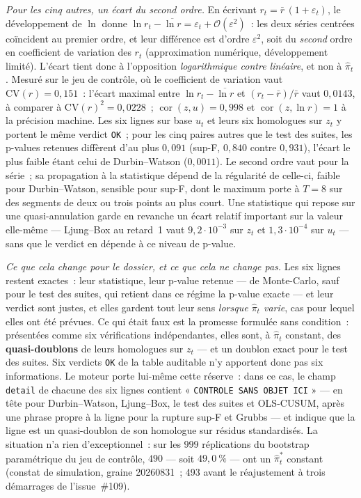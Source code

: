 \documentclass[a4paper,11pt]{article}
\newcommand{\code}[1]{\texttt{\small #1}}
\begin{document}
\emph{Pour les cinq autres, un écart du second ordre.} En écrivant
$r_t = \bar r\,(1 + \varepsilon_t)$, le développement de $\ln$ donne
$\ln r_t - \overline{\ln r} = \varepsilon_t + \mathcal{O}(\varepsilon^2)$~: les
deux séries centrées coïncident au premier ordre, et leur différence est
d'ordre $\varepsilon^2$, soit du \emph{second} ordre en coefficient de
variation des $r_t$ (approximation numérique, développement limité). L'écart
tient donc à l'opposition \emph{logarithmique contre linéaire}, et non à
$\hat\pi_t$. Mesuré sur le jeu de contrôle, où le coefficient de variation vaut
$\mathrm{CV}(r) = 0{,}151$~: l'écart maximal entre $\ln r_t - \overline{\ln r}$
et $(r_t - \bar r)/\bar r$ vaut $0{,}0143$, à comparer à
$\mathrm{CV}(r)^2 = 0{,}0228$~;
$\operatorname{cor}(z, u) = 0{,}998$ et $\operatorname{cor}(z, \ln r) = 1$ à la
précision machine. Les six lignes sur base $u_t$ et leurs six homologues sur
$z_t$ y portent le même verdict \code{OK}~; pour les cinq paires autres que le
test des suites, les p-values retenues diffèrent d'au plus $0{,}091$ (sup-F,
$0{,}840$ contre $0{,}931$), l'écart le plus faible étant celui de
Durbin--Watson ($0{,}0011$). Le second ordre vaut pour la série~; sa propagation à la
statistique dépend de la régularité de celle-ci, faible pour Durbin--Watson, sensible pour
sup-F, dont le maximum porte à $T = 8$ sur des segments de deux ou trois points au plus
court. Une statistique qui
repose sur une quasi-annulation garde en revanche un écart relatif important
sur la valeur elle-même --- Ljung--Box au retard~1 vaut $9{,}2\cdot 10^{-3}$
sur $z_t$ et $1{,}3\cdot 10^{-4}$ sur $u_t$ --- sans que le verdict en dépende
à ce niveau de p-value.

\emph{Ce que cela change pour le dossier, et ce que cela ne change pas.} Les
six lignes restent exactes~: leur statistique, leur p-value retenue --- de
Monte-Carlo, sauf pour le test des suites, qui retient dans ce régime la
p-value exacte --- et leur verdict sont justes, et elles gardent tout leur sens \emph{lorsque
$\hat\pi_t$ varie}, cas pour lequel elles ont été prévues. Ce qui était faux
est la promesse formulée sans condition~: présentées comme six vérifications
indépendantes, elles sont, à $\hat\pi_t$ constant, des \textbf{quasi-doublons}
de leurs homologues sur $z_t$ --- et un doublon exact pour le test des suites.
Six verdicts \code{OK} de la table auditable n'y apportent donc pas six
informations. Le moteur porte lui-même cette réserve~: dans ce cas, le champ
\code{detail} de chacune des six lignes contient « \code{CONTROLE SANS
OBJET ICI} » --- en tête pour Durbin--Watson, Ljung--Box, le test des suites et
OLS-CUSUM, après une phrase propre à la ligne pour la rupture sup-F et Grubbs ---
et indique que la ligne est un quasi-doublon de son homologue sur
résidus standardisés. La situation n'a rien d'exceptionnel~: sur les $999$
réplications du bootstrap paramétrique du jeu de contrôle, $490$ --- soit
$49{,}0~\%$ --- ont un $\hat\pi_t^{*}$ constant (constat de simulation, graine
20260831~; 493 avant le réajustement à trois démarrages de l'issue~\#109).
\end{document}
